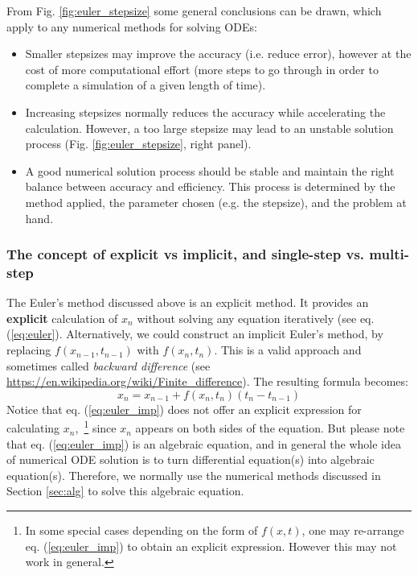 \documentclass[a4paper,11pt]{article}
\theoremstyle{definition}
\begin{document}
From Fig. \ref{fig:euler_stepsize} some general conclusions can be drawn, which apply to
any numerical methods for solving ODEs:
\begin{itemize}
	\item Smaller stepsizes may improve the accuracy (i.e. reduce error), however at the cost of more computational effort 
		(more steps to go through in order to complete a simulation of a given length of time).
	\item Increasing stepsizes normally reduces the accuracy while accelerating the calculation. However, a too large stepsize may 
		lead to an unstable solution process (Fig. \ref{fig:euler_stepsize}, right panel).
	\item A good numerical solution process should be stable and maintain the right balance between accuracy and efficiency.
		This process is determined by the method applied, the parameter chosen (e.g. the stepsize), and the problem at hand.
\end{itemize}

\subsubsection*{The concept of explicit vs implicit, and single-step vs. multi-step}

The Euler's method discussed above is an explicit method. It provides
an \textbf{explicit} calculation of $x_n$ without solving any equation iteratively
(see eq. (\ref{eq:euler}). Alternatively, we could construct an implicit Euler's method,
by replacing $f(x_{n-1}, t_{n-1})$ with $f(x_n, t_n)$. This is a valid approach and sometimes
called \emph{backward difference} (see \url{https://en.wikipedia.org/wiki/Finite_difference}).
The resulting formula becomes:
\begin{equation} \label{eq:euler_imp}
	x_n = x_{n-1} + f(x_n, t_n) (t_n - t_{n-1})
\end{equation}
\noindent Notice that eq. (\ref{eq:euler_imp}) does not offer an explicit expression for calculating $x_n$,\
\footnote{In some special cases depending on the form of $f(x, t)$, one may re-arrange 
eq. (\ref{eq:euler_imp}) to obtain an explicit expression. However this may not work in general.}
since $x_n$ appears on both sides of the equation. 
But please note that eq. (\ref{eq:euler_imp}) is an algebraic equation, and in general the whole
idea of numerical ODE solution is to turn differential equation(s) into algebraic equation(s).
Therefore, we normally use the numerical methods discussed in Section \ref{sec:alg} to solve this algebraic equation.
\end{document}
